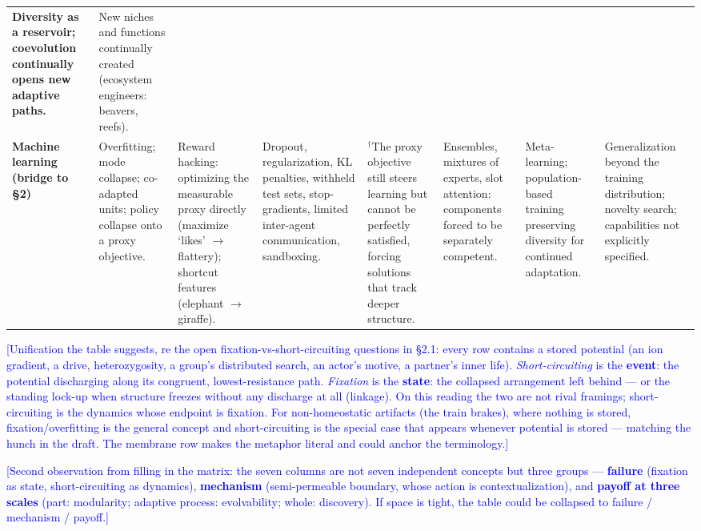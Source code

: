 \documentclass[11pt]{article}
\newcommand{\note}[1]{{\footnotesize\textcolor{blue}{[#1]}}}
\begin{document}
\begin{landscape}
\begin{table}[p]
\begin{tabularx}{\linewidth}{@{}>{\RaggedRight\arraybackslash\bfseries}p{1.9cm} Y Y Y Y Y Y Y@{}}
Diversity as a reservoir; coevolution continually opens new adaptive paths. &
New niches and functions continually created (ecosystem engineers: beavers, reefs). \\
\addlinespace
Machine learning (bridge to \S2) &
Overfitting; mode collapse; co-adapted units; policy collapse onto a proxy objective. &
Reward hacking: optimizing the measurable proxy directly (maximize `likes' $\to$ flattery); shortcut features (elephant $\to$ giraffe). &
Dropout, regularization, KL penalties, withheld test sets, stop-gradients, limited inter-agent communication, sandboxing. &
$^{\dagger}$The proxy objective still steers learning but cannot be perfectly satisfied, forcing solutions that track deeper structure. &
Ensembles, mixtures of experts, slot attention: components forced to be separately competent. &
Meta-learning; population-based training preserving diversity for continued adaptation. &
Generalization beyond the training distribution; novelty search; capabilities not explicitly specified. \\
\bottomrule
\end{tabularx}
\end{table}
\end{landscape}

\note{Unification the table suggests, re the open fixation-vs-short-circuiting questions in \S2.1: every row contains a stored potential (an ion gradient, a drive, heterozygosity, a group's distributed search, an actor's motive, a partner's inner life). \textit{Short-circuiting} is the \textbf{event}: the potential discharging along its congruent, lowest-resistance path. \textit{Fixation} is the \textbf{state}: the collapsed arrangement left behind --- or the standing lock-up when structure freezes without any discharge at all (linkage). On this reading the two are not rival framings; short-circuiting is the dynamics whose endpoint is fixation. For non-homeostatic artifacts (the train brakes), where nothing is stored, fixation/overfitting is the general concept and short-circuiting is the special case that appears whenever potential is stored --- matching the hunch in the draft. The membrane row makes the metaphor literal and could anchor the terminology.}

\note{Second observation from filling in the matrix: the seven columns are not seven independent concepts but three groups --- \textbf{failure} (fixation as state, short-circuiting as dynamics), \textbf{mechanism} (semi-permeable boundary, whose action is contextualization), and \textbf{payoff at three scales} (part: modularity; adaptive process: evolvability; whole: discovery). If space is tight, the table could be collapsed to failure / mechanism / payoff.}
\end{document}
